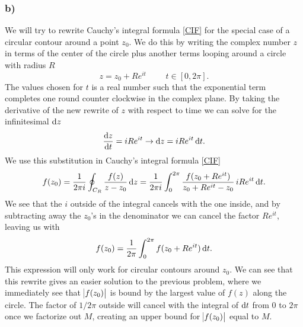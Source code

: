 \documentclass[12pt,twoside]{article}
\begin{document}
\subsubsection*{b)}
We will try to rewrite Cauchy's integral formula \eqref{CIF} for the special case of a circular contour around a point $z_0$. We do this by writing the complex number $z$ in terms of the center of the circle plus another terms looping around a circle with radius $R$
\begin{equation}
  z = z_0 + R e^{it} \,\,\qquad t \in [0, 2\pi].
\end{equation}
The values chosen for $t$ is a real number such that the exponential term completes one round counter clockwise in the complex plane. By taking the derivative of the new rewrite of $z$ with respect to time we can solve for the infinitesimal $\dif z$
\begin{equation}
  \frac{\dif z}{\dif t} = iRe^{it} \rightarrow \dif z = iRe^{it} \dif t.
\end{equation}
We use this substitution in Cauchy's integral formula \eqref{CIF}
\begin{equation}
  f(z_0) = \frac{1}{2\pi i} \oint_{C_R} \frac{f(z)}{z-z_0}\dif z = \frac{1}{2\pi i} \int_{0}^{2\pi} \frac{f(z_0+Re^{it})}{z_0+Re^{it}-z_0}\,iRe^{it} \dif t.
\end{equation}
We see that the $i$ outside of the integral cancels with the one inside, and by subtracting away the $z_0$'s in the denominator we can cancel the factor $Re^{it}$, leaving us with
\begin{equation}
  f(z_0) = \frac{1}{2\pi} \int_{0}^{2\pi} f(z_0+Re^{it}) \dif t. \label{answer1b}
\end{equation}
This expression will only work for circular contours around $z_0$. We can see that this rewrite gives an easier solution to the previous problem, where we immediately see that $\abs{f(z_0)}$ is bound by the largest value of $f(z)$ along the circle. The factor of $1/2\pi$ outside will cancel with the integral of $\dif t$ from $0$ to $2\pi$ once we factorize out $M$, creating an upper bound for $\abs{f(z_0)}$ equal to $M$.
\end{document}
